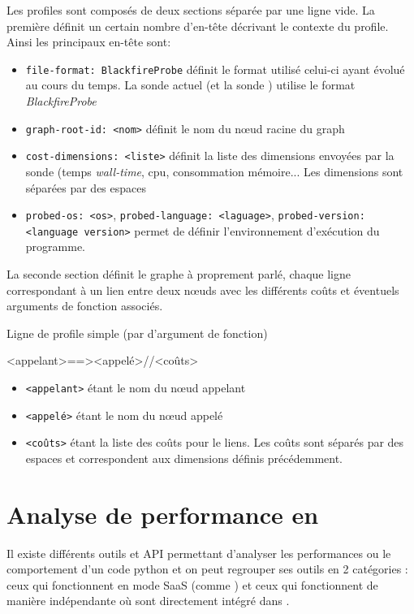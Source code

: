 Les profiles sont composés de deux sections séparée par une ligne vide. La première définit un certain nombre d'en-tête décrivant le contexte du profile. Ainsi les principaux en-tête sont:
\begin{itemize}
\item \verb|file-format: BlackfireProbe| définit le format utilisé celui-ci ayant évolué au cours du temps. La sonde actuel (et la sonde \Python) utilise le format \emph{BlackfireProbe}
\item \verb|graph-root-id: <nom>| définit le nom du nœud racine du graph
\item \verb|cost-dimensions: <liste>| définit la liste des dimensions envoyées par la sonde (temps \emph{wall-time}, cpu, consommation mémoire... Les dimensions sont séparées par des espaces
\item \verb|probed-os: <os>|, \verb|probed-language: <laguage>|, \verb|probed-version: <language version>| permet de définir l'environnement d'exécution du programme.
\end{itemize}

La seconde section définit le graphe à proprement parlé, chaque ligne correspondant à un lien entre deux nœuds avec les différents coûts et éventuels arguments de fonction associés.

\begin{listing}[H]
\caption{Ligne de profile simple (par d'argument de fonction)}
\begin{textcode}
<appelant>==><appelé>//<coûts>
\end{textcode}
\end{listing}

\begin{itemize}
\item \verb|<appelant>| étant le nom du nœud appelant
\item \verb|<appelé>| étant le nom du nœud appelé
\item \verb|<coûts>| étant la liste des coûts pour le liens. Les coûts sont séparés par des espaces et correspondent aux dimensions définis précédemment.
\end{itemize}

	\chapter[Analyse en \Python]{Analyse de performance en \Python}
Il existe différents outils et API permettant d'analyser les performances ou le comportement d'un code python et on peut regrouper ses outils en 2 catégories : ceux qui fonctionnent en mode \gls{SaaS} (comme \Blackfire) et ceux qui fonctionnent de manière indépendante où sont directement intégré dans \Python.

